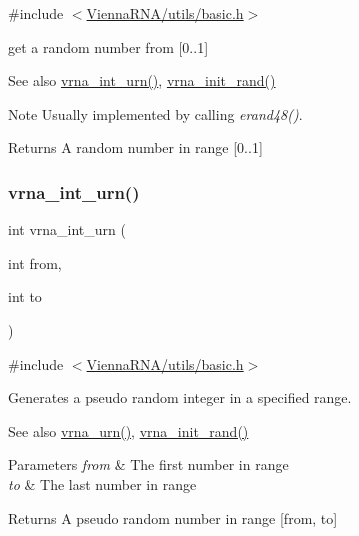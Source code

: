 {\ttfamily \#include $<$\mbox{\hyperlink{utils_2basic_8h}{Vienna\+R\+N\+A/utils/basic.\+h}}$>$}



get a random number from \mbox{[}0..1\mbox{]} 

\begin{DoxySeeAlso}{See also}
\mbox{\hyperlink{group__utils_ga46111bb3747dbcf4609f0d40ae169ad9}{vrna\+\_\+int\+\_\+urn()}}, \mbox{\hyperlink{group__utils_ga0ad1f40ea316e5c5918695c35613027a}{vrna\+\_\+init\+\_\+rand()}} 
\end{DoxySeeAlso}
\begin{DoxyNote}{Note}
Usually implemented by calling {\itshape erand48()}. 
\end{DoxyNote}
\begin{DoxyReturn}{Returns}
A random number in range \mbox{[}0..1\mbox{]} 
\end{DoxyReturn}
\mbox{\label{group__utils_ga46111bb3747dbcf4609f0d40ae169ad9}} 
\subsubsection{\texorpdfstring{vrna\_int\_urn()}{vrna\_int\_urn()}}
{\footnotesize\ttfamily int vrna\+\_\+int\+\_\+urn (\begin{DoxyParamCaption}\item[{int}]{from,  }\item[{int}]{to }\end{DoxyParamCaption})}



{\ttfamily \#include $<$\mbox{\hyperlink{utils_2basic_8h}{Vienna\+R\+N\+A/utils/basic.\+h}}$>$}



Generates a pseudo random integer in a specified range. 

\begin{DoxySeeAlso}{See also}
\mbox{\hyperlink{group__utils_ga384e256ebb295d04a14426179db0dd6e}{vrna\+\_\+urn()}}, \mbox{\hyperlink{group__utils_ga0ad1f40ea316e5c5918695c35613027a}{vrna\+\_\+init\+\_\+rand()}} 
\end{DoxySeeAlso}

\begin{DoxyParams}{Parameters}
{\em from} & The first number in range \\
\hline
{\em to} & The last number in range \\
\hline
\end{DoxyParams}
\begin{DoxyReturn}{Returns}
A pseudo random number in range \mbox{[}from, to\mbox{]} 
\end{DoxyReturn}
\mbox{\label{group__utils_gad3bbe8d01afb1310609cb018d5290550}} 
